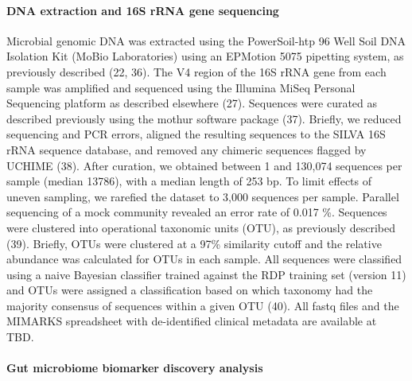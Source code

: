 \documentclass[11pt,]{article}
\let\oldparagraph\paragraph
\renewcommand{\paragraph}[1]{\oldparagraph{#1}\mbox{}}
\begin{document}
\paragraph{DNA extraction and 16S rRNA gene
sequencing}\label{dna-extraction-and-16s-rrna-gene-sequencing}

Microbial genomic DNA was extracted using the PowerSoil-htp 96 Well Soil
DNA Isolation Kit (MoBio Laboratories) using an EPMotion 5075 pipetting
system, as previously described (22, 36). The V4 region of the 16S rRNA
gene from each sample was amplified and sequenced using the Illumina
MiSeq Personal Sequencing platform as described elsewhere (27).
Sequences were curated as described previously using the mothur software
package (37). Briefly, we reduced sequencing and PCR errors, aligned the
resulting sequences to the SILVA 16S rRNA sequence database, and removed
any chimeric sequences flagged by UCHIME (38). After curation, we
obtained between 1 and 130,074 sequences per sample (median 13786), with
a median length of 253 bp. To limit effects of uneven sampling, we
rarefied the dataset to 3,000 sequences per sample. Parallel sequencing
of a mock community revealed an error rate of 0.017 \%. Sequences were
clustered into operational taxonomic units (OTU), as previously
described (39). Briefly, OTUs were clustered at a 97\% similarity cutoff
and the relative abundance was calculated for OTUs in each sample. All
sequences were classified using a naive Bayesian classifier trained
against the RDP training set (version 11) and OTUs were assigned a
classification based on which taxonomy had the majority consensus of
sequences within a given OTU (40). All fastq files and the MIMARKS
spreadsheet with de-identified clinical metadata are available at TBD.

\paragraph{Gut microbiome biomarker discovery
analysis}\label{gut-microbiome-biomarker-discovery-analysis}
\end{document}
